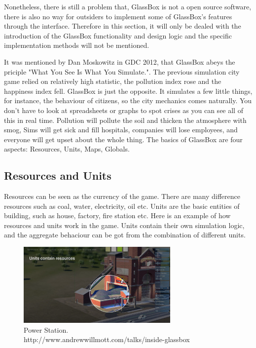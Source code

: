 Nonetheless, there is still a problem that, GlassBox is not a open source software, there is also no way for outsiders to implement some of GlassBox's features through the interface. Therefore in this section, it will only be dealed with the introduction of the GlassBox functionality and design logic and the specific implementation methods will not be mentioned.

It was mentioned by Dan Moskowitz in GDC 2012, that GlassBox abeys the priciple "What You See Is What You Simulate.". The previous simulation city game relied on relatively high statistic, the pollution index rose and the happiness index fell. GlassBox is just the opposite. It simulates a few little things, for instance, the behaviour of citizens, so the city mechanics comes naturally. You don't have to look at spreadsheets or graphs to spot crises as you can see all of this in real time. Pollution will pollute the soil and thicken the atmosphere with smog, Sims will get sick and fill hospitals, companies will lose employees, and everyone will get upset about the whole thing. The basics of GlassBox are four aspects: Resources, Units, Maps, Globals.

\subsection{Resources and Units}

Resources can be seen as the currency of the game. There are many difference resources such as coal, water, electricity, oil etc. Units are the basic entities of building, such as house, factory, fire station etc. Here is an example of how resources and units work in the game. Units contain their own simulation logic, and the aggregate behaciour can be got from the combination of different units.

\begin{figure}[htb]
	\centering
	\includegraphics[width=0.7\textwidth]{gfx/resource}  	  	 	
	\caption{Power Station.\\ http://www.andrewwillmott.com/talks/inside-glassbox}
	\label{fig:example5_1}
\end{figure}

